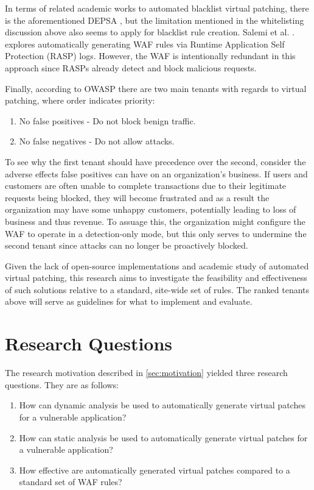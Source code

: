 In terms of related academic works to automated blacklist virtual patching, there is the aforementioned DEPSA \cite{betarte_towards_2016}, but the limitation mentioned in the whitelisting discussion above also seems to apply for blacklist rule creation. Salemi et al. \cite{waf_rasp}. explores automatically generating WAF rules via Runtime Application Self Protection (RASP) logs. However, the WAF is intentionally redundant in this approach since RASPs already detect and block malicious requests.

Finally, according to OWASP \cite{virtualpatchingcheat} there are two main tenants with regards to virtual patching, where order indicates priority:
\begin{enumerate}
\item No false positives - Do not block benign traffic.
\item No false negatives - Do not allow attacks.
\end{enumerate}

To see why the first tenant should have precedence over the second, consider the adverse effects false positives can have on an organization's business. If users and customers are often unable to complete transactions due to their legitimate requests being blocked, they will become frustrated and as a result the organization may have some unhappy customers, potentially leading to loss of business and thus revenue. To assuage this, the organization might configure the WAF to operate in a detection-only mode, but this only serves to undermine the second tenant since attacks can no longer be proactively blocked.

Given the lack of open-source implementations and academic study of automated virtual patching, this research aims to investigate the feasibility and effectiveness of such solutions relative to a standard, site-wide set of rules. The ranked tenants above will serve as guidelines for what to implement and evaluate.


\section{Research Questions} \label{sec:questions}
The research motivation described in \ref{sec:motivation} yielded three research questions. They are as follows:
\begin{enumerate}
	\item How can dynamic analysis be used to automatically generate virtual patches for a vulnerable application?
	\item How can static analysis be used to automatically generate virtual patches for a vulnerable application?
	\item How effective are automatically generated virtual patches compared to a standard set of WAF rules?
\end{enumerate}

